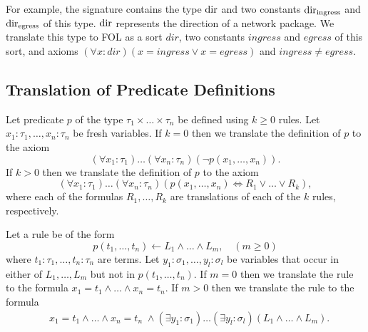 For example, the signature contains the type $\mathrm{dir}$ and two constants $\mathrm{dir}_\text{ingress}$ and $\mathrm{dir}_\text{egress}$ of this type. $\mathrm{dir}$ represents the direction of a network package. We translate this type to FOL as a sort $\mathit{dir}$, two constants $\mathit{ingress}$ and $\mathit{egress}$ of this sort, and axioms $(\forall x:\mathit{dir})(x=\mathit{ingress}\vee x=\mathit{egress})$ and $\mathit{ingress}\neq\mathit{egress}$.


\subsection{Translation of Predicate Definitions}\label{sect:aws/fol/predicates}


Let predicate $p$ of the type $\tau_1\times\ldots\times\tau_n$ be defined using $k\ge0$ rules. Let $x_1:\tau_1,\ldots,x_n:\tau_n$ be fresh variables. If $k=0$ then we translate the definition of $p$ to the axiom $$(\forall x_1:\tau_1)\ldots(\forall x_n:\tau_n)(\neg p(x_1,\ldots,x_n)).$$ If $k>0$ then we translate the definition of $p$ to the axiom $$(\forall x_1:\tau_1)\ldots(\forall x_n:\tau_n)(p(x_1,\ldots,x_n)\Leftrightarrow R_1\vee\ldots\vee R_k),$$ where each of the formulas $R_1,\ldots,R_k$ are translations of each of the $k$ rules, respectively.

Let a rule be of the form $$p(t_1,\ldots,t_n)\leftarrow L_1\wedge\ldots\wedge L_m, \quad(m\ge0)$$ where $t_1:\tau_1,\ldots,t_n:\tau_n$ are terms. Let $y_1:\sigma_1,\ldots,y_l:\sigma_l$ be variables that occur in either of $L_1,\ldots,L_m$ but not in $p(t_1,\ldots,t_n)$. If $m=0$ then we translate the rule to the formula $x_1=t_1\wedge\ldots\wedge x_n=t_n.$ If $m>0$ then we translate the rule to the formula
\begin{equation*}
\begin{aligned}
&x_1=t_1\wedge\ldots\wedge x_n=t_n\;\wedge(\exists y_1:\sigma_1)\ldots(\exists y_l:\sigma_l)(L_1\wedge\ldots\wedge L_m).
\end{aligned}
\end{equation*}

